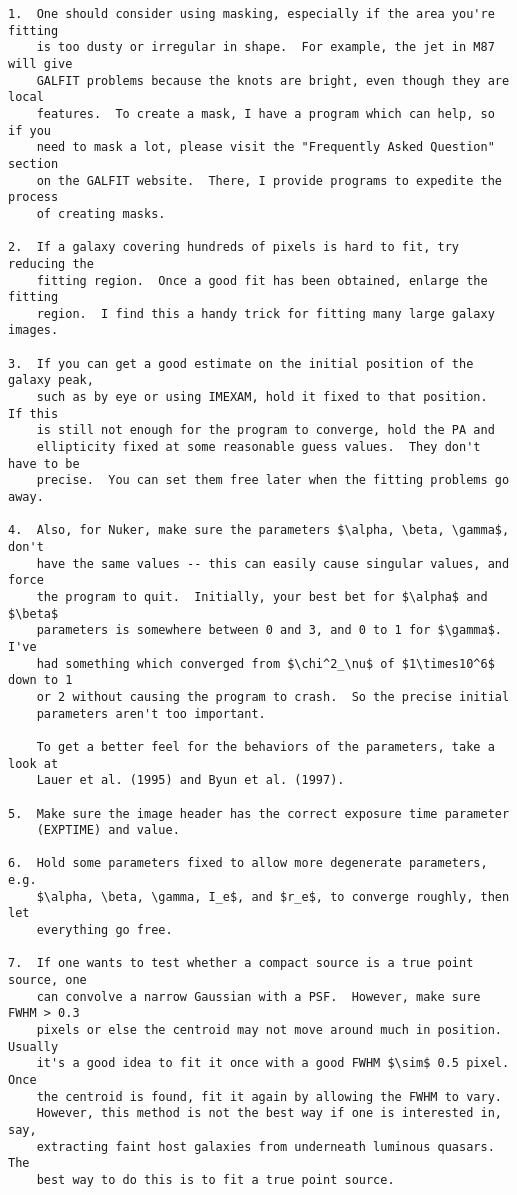 \documentclass[preprint]{aastex}
\begin{document}
\begin {verbatim}
1.  One should consider using masking, especially if the area you're fitting
    is too dusty or irregular in shape.  For example, the jet in M87 will give
    GALFIT problems because the knots are bright, even though they are local
    features.  To create a mask, I have a program which can help, so if you
    need to mask a lot, please visit the "Frequently Asked Question" section
    on the GALFIT website.  There, I provide programs to expedite the process
    of creating masks.

2.  If a galaxy covering hundreds of pixels is hard to fit, try reducing the
    fitting region.  Once a good fit has been obtained, enlarge the fitting
    region.  I find this a handy trick for fitting many large galaxy images.

3.  If you can get a good estimate on the initial position of the galaxy peak,
    such as by eye or using IMEXAM, hold it fixed to that position.  If this
    is still not enough for the program to converge, hold the PA and
    ellipticity fixed at some reasonable guess values.  They don't have to be
    precise.  You can set them free later when the fitting problems go away.

4.  Also, for Nuker, make sure the parameters $\alpha, \beta, \gamma$, don't
    have the same values -- this can easily cause singular values, and force
    the program to quit.  Initially, your best bet for $\alpha$ and $\beta$
    parameters is somewhere between 0 and 3, and 0 to 1 for $\gamma$.  I've
    had something which converged from $\chi^2_\nu$ of $1\times10^6$ down to 1
    or 2 without causing the program to crash.  So the precise initial
    parameters aren't too important.

    To get a better feel for the behaviors of the parameters, take a look at
    Lauer et al. (1995) and Byun et al. (1997).

5.  Make sure the image header has the correct exposure time parameter
    (EXPTIME) and value.

6.  Hold some parameters fixed to allow more degenerate parameters, e.g.
    $\alpha, \beta, \gamma, I_e$, and $r_e$, to converge roughly, then let
    everything go free.

7.  If one wants to test whether a compact source is a true point source, one
    can convolve a narrow Gaussian with a PSF.  However, make sure FWHM > 0.3
    pixels or else the centroid may not move around much in position.  Usually
    it's a good idea to fit it once with a good FWHM $\sim$ 0.5 pixel.  Once
    the centroid is found, fit it again by allowing the FWHM to vary.
    However, this method is not the best way if one is interested in, say,
    extracting faint host galaxies from underneath luminous quasars.  The
    best way to do this is to fit a true point source.


\end{verbatim}
\end{document}
